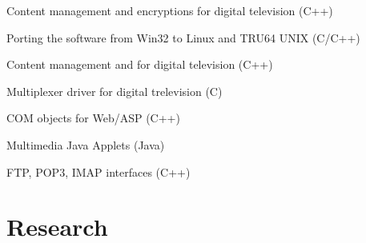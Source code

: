 \documentclass[a4paper]{deedy-resume} %
\begin{document}
\begin{minipage}[t]{0.66\textwidth}
\sectionspace %



\begin{tightitemize}
\item Content management and encryptions for digital television (C++)
\item Porting the software from Win32 to Linux and TRU64 UNIX (C/C++)
\end{tightitemize}

\sectionspace %



\begin{tightitemize}
\item Content management and for digital television (C++)
\item Multiplexer driver for digital trelevision (C)
\end{tightitemize}

\sectionspace %



\begin{tightitemize}
\item COM objects for Web/ASP (C++)
\item Multimedia Java Applets (Java)
\item FTP, POP3, IMAP interfaces (C++)
\end{tightitemize}

\sectionspace %


\section{Research}



\end{minipage}
\end{document}
